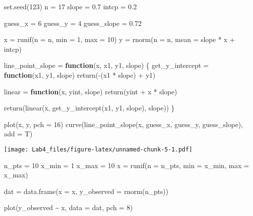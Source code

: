 \documentclass[
]{article}
\newenvironment{Shaded}{\begin{snugshade}}{\end{snugshade}}
\newcommand{\AttributeTok}[1]{\textcolor[rgb]{0.77,0.63,0.00}{#1}}
\newcommand{\ControlFlowTok}[1]{\textcolor[rgb]{0.13,0.29,0.53}{\textbf{#1}}}
\newcommand{\DecValTok}[1]{\textcolor[rgb]{0.00,0.00,0.81}{#1}}
\newcommand{\FloatTok}[1]{\textcolor[rgb]{0.00,0.00,0.81}{#1}}
\newcommand{\FunctionTok}[1]{\textcolor[rgb]{0.00,0.00,0.00}{#1}}
\newcommand{\NormalTok}[1]{#1}
\newcommand{\OtherTok}[1]{\textcolor[rgb]{0.56,0.35,0.01}{#1}}
\newcommand{\SpecialCharTok}[1]{\textcolor[rgb]{0.00,0.00,0.00}{#1}}
\begin{document}
\begin{Shaded}
\begin{Highlighting}[]
\FunctionTok{set.seed}\NormalTok{(}\DecValTok{123}\NormalTok{)}
\NormalTok{n }\OtherTok{=} \DecValTok{17}
\NormalTok{slope }\OtherTok{=} \FloatTok{0.7}
\NormalTok{intcp }\OtherTok{=} \FloatTok{0.2}

\NormalTok{guess\_x }\OtherTok{=} \DecValTok{6}
\NormalTok{guess\_y }\OtherTok{=} \DecValTok{4}
\NormalTok{guess\_slope }\OtherTok{=} \FloatTok{0.72}

\NormalTok{x }\OtherTok{=} \FunctionTok{runif}\NormalTok{(}\AttributeTok{n =}\NormalTok{ n, }\AttributeTok{min =} \DecValTok{1}\NormalTok{, }\AttributeTok{max =} \DecValTok{10}\NormalTok{)}
\NormalTok{y }\OtherTok{=} \FunctionTok{rnorm}\NormalTok{(}\AttributeTok{n =}\NormalTok{ n, }\AttributeTok{mean =}\NormalTok{ slope }\SpecialCharTok{*}\NormalTok{ x }\SpecialCharTok{+}\NormalTok{ intcp)}

\NormalTok{line\_point\_slope }\OtherTok{=} \ControlFlowTok{function}\NormalTok{(x, x1, y1, slope)}
\NormalTok{\{}
\NormalTok{  get\_y\_intercept }\OtherTok{=} 
    \ControlFlowTok{function}\NormalTok{(x1, y1, slope) }
      \FunctionTok{return}\NormalTok{(}\SpecialCharTok{{-}}\NormalTok{(x1 }\SpecialCharTok{*}\NormalTok{ slope) }\SpecialCharTok{+}\NormalTok{ y1)}
  
\NormalTok{  linear }\OtherTok{=} 
    \ControlFlowTok{function}\NormalTok{(x, yint, slope) }
      \FunctionTok{return}\NormalTok{(yint }\SpecialCharTok{+}\NormalTok{ x }\SpecialCharTok{*}\NormalTok{ slope)}
  
  \FunctionTok{return}\NormalTok{(}\FunctionTok{linear}\NormalTok{(x, }\FunctionTok{get\_y\_intercept}\NormalTok{(x1, y1, slope), slope))}
\NormalTok{\}}

\FunctionTok{plot}\NormalTok{(x, y, }\AttributeTok{pch =} \DecValTok{16}\NormalTok{)}
\FunctionTok{curve}\NormalTok{(}\FunctionTok{line\_point\_slope}\NormalTok{(x, guess\_x, guess\_y, guess\_slope), }\AttributeTok{add =}\NormalTok{ T)}
\end{Highlighting}
\end{Shaded}

\texttt{[image: Lab4\_files/figure-latex/unnamed-chunk-5-1.pdf]}

\begin{Shaded}
\begin{Highlighting}[]
\NormalTok{n\_pts }\OtherTok{=} \DecValTok{10}
\NormalTok{x\_min }\OtherTok{=} \DecValTok{1}
\NormalTok{x\_max }\OtherTok{=} \DecValTok{10}
\NormalTok{x }\OtherTok{=} \FunctionTok{runif}\NormalTok{(}\AttributeTok{n =}\NormalTok{ n\_pts, }\AttributeTok{min =}\NormalTok{ x\_min, }\AttributeTok{max =}\NormalTok{ x\_max)}

\NormalTok{dat }\OtherTok{=} \FunctionTok{data.frame}\NormalTok{(}\AttributeTok{x =}\NormalTok{ x, }\AttributeTok{y\_observed =} \FunctionTok{rnorm}\NormalTok{(n\_pts))}

\FunctionTok{plot}\NormalTok{(y\_observed }\SpecialCharTok{\textasciitilde{}}\NormalTok{ x, }\AttributeTok{data =}\NormalTok{ dat, }\AttributeTok{pch =} \DecValTok{8}\NormalTok{)}
\end{Highlighting}
\end{Shaded}
\end{document}
